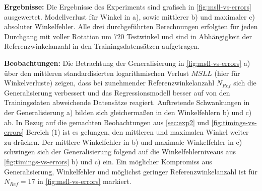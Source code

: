 \vspace{5mm}
\begin{table}[htp]
	\centering
	\caption{Abweichende Simulationsparameter im Experiment zur Rauschniveauanpassung.}
	\label{tab:params-exp3}
\end{table}


\clearpage


\textbf{Ergebnisse:} Die Ergebnisse des Experiments sind grafisch in \autoref{fig:msll-vs-errors} ausgewertet. Modellverlust für Winkel in a), sowie mittlerer b) und maximaler c) absoluter Winkelfehler. Alle drei durchgeführten Berechnungen erfolgten für jeden Durchgang mit voller Rotation um $720$ Testwinkel und sind in Abhängigkeit der Referenzwinkelanzahl in den Trainingsdatensätzen aufgetragen.

\textbf{Beobachtungen:} Die Betrachtung der Generalisierung in \autoref{fig:msll-vs-errors} a) über den mittleren standardisierten logarithmischen Verlust $MSLL$ (hier für Winkelverluste) zeigen, dass bei zunehmender Referenzwinkelanzahl $N_{Ref}$ sich die Generalisierung verbessert und das Regressionsmodell besser auf von den Trainingsdaten abweichende Datensätze reagiert. Auftretende Schwankungen in der Generalisierung a) bilden sich gleichermaßen in den Winkelfehlern b) und c) ab. In Bezug auf die gemachten Beobachtungen aus \autoref{sec:exp2} und \autoref{fig:timings-vs-errors} Bereich (1) ist es gelungen, den mittleren und maximalen Winkel weiter zu drücken. Der mittlere Winkelfehler in b) und maximale Winkelfehler in c) schwingen sich der Generalisierung folgend auf die Winkelfehlerniveaus aus \autoref{fig:timings-vs-errors} b) und c) ein. Ein möglicher Kompromiss aus Generalisierung, Winkelfehler und möglichst geringer Referenzwinkelanzahl ist für $N_{Ref} = 17$ in \autoref{fig:msll-vs-errors} markiert.


